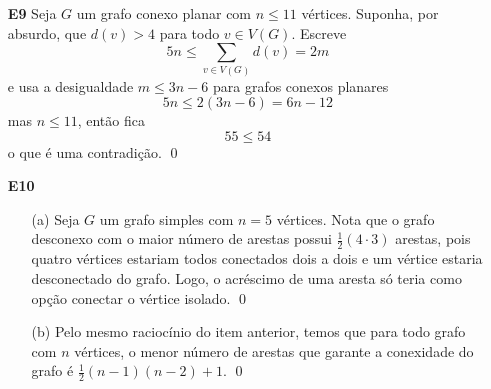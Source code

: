\documentclass{article}
\begin{document}
\begin{enumerate}
        \[
            6n \leq \sum_{v \in V(G)} d(v) = 2m
        \]
        \noindent mas sabemos que para grafos conexos planares vale \(m \leq 3n-6\), então vem 
        \[
            6n \leq 2(3n-6) = 6n-12
        \]
        \noindent o que é uma contradição. \qed
    \item [\textbf{E9}]
        Seja \(G\) um grafo conexo planar com \(n \leq 11\) vértices. Suponha, por absurdo, que \(d(v) > 4\) para todo \(v \in V(G)\). Escreve 
        \[
            5n \leq \sum_{v \in V(G)} d(v) = 2m
        \]
        \noindent e usa a desigualdade \(m \leq 3n-6\) para grafos conexos planares
        \[
            5n \leq 2(3n-6) = 6n - 12
        \]
        \noindent mas \(n \leq 11\), então fica
        \[
            55 \leq 54
        \]
        \noindent o que é uma contradição. \qed
    \item [\textbf{E10}]
        \begin{enumerate}
            \item [(a)] Seja \(G\) um grafo simples com \(n=5\) vértices. Nota que o grafo desconexo com o maior número de arestas possui \(\displaystyle\frac{1}{2}(4\cdot3)\) arestas, pois quatro vértices estariam todos conectados dois a dois e um vértice estaria desconectado do grafo. Logo, o acréscimo de uma aresta só teria como opção conectar o vértice isolado. \qed
            \item [(b)] Pelo mesmo raciocínio do item anterior, temos que para todo grafo com \(n\) vértices, o menor número de arestas que garante a conexidade do grafo é \(\displaystyle\frac{1}{2}(n-1)(n-2)+1\). \qed
        \end{enumerate}
\end{enumerate}
\end{document}
